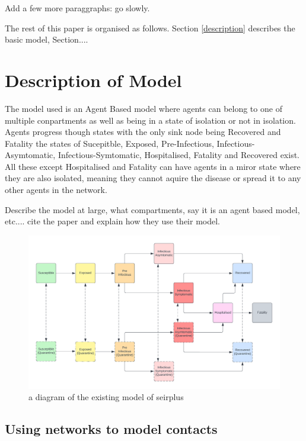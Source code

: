 \documentclass{article}
\begin{document}
Add a few more paraggraphs: go slowly.


The rest of this paper is organised as follows. Section \ref{description} describes the basic model, Section....



\section{Description of Model \label{description}}
The model used is an Agent Based model where agents can belong to one of multiple conpartments as well as being in a state of isolation or not in isolation.
Agents progress though states with the only sink node being Recovered and Fatality
the states of Sucepitble, Exposed, Pre-Infectious, Infectious-Asymtomatic, Infectious-Symtomatic, Hospitalised, Fatality and Recovered exist. All these except Hospitalised and Fatality can have agents in a miror state where they are also isolated, meaning they cannot aquire the disease or spread it to any other agents in the network.

Describe the model at large, what compartments, say it is an agent based model, etc.... cite the paper and explain how they use their model.


\begin{figure}
  \centering
      \includegraphics[width=\textwidth]{SIR}
  \caption{a diagram of the existing model of seirplus ~\cite{mcgee_2021}}
\end{figure}

\newpage



\subsection{Using networks to model contacts}
\end{document}
